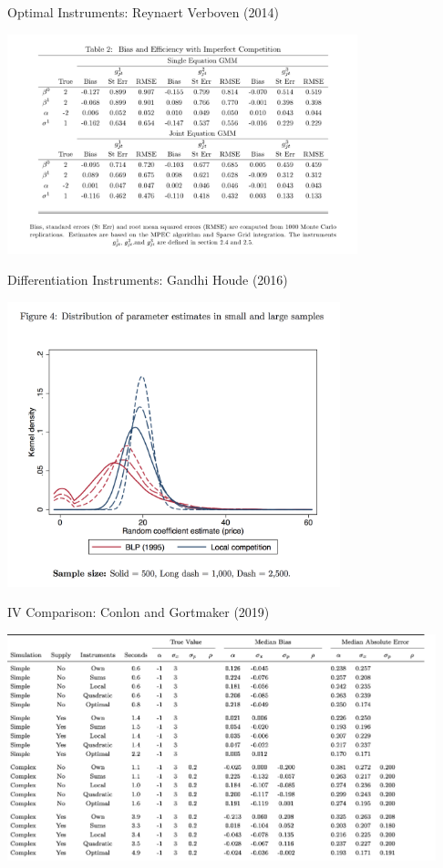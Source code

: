 \documentclass[xcolor=pdftex,dvipsnames,table,mathserif,aspectratio=169]{beamer}
\begin{document}
\begin{frame}{Optimal Instruments: Reynaert Verboven (2014)}
\begin{center}
\includegraphics[width=4in]{resources/verboven.png}
\end{center}
\end{frame}


\begin{frame}{Differentiation Instruments: Gandhi Houde (2016)}
\begin{center}
\includegraphics[width=3.8in]{resources/d_iv1.png}
\end{center}
\end{frame}

\begin{frame}{IV Comparison: Conlon and Gortmaker (2019)}
\begin{center}
\includegraphics[width=4.9in]{resources/inst_table.png}
\end{center}
\end{frame}
\end{document}
